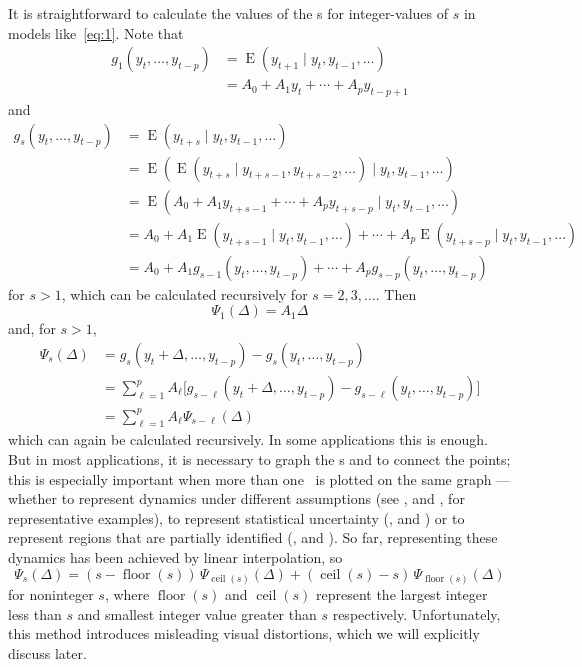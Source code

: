 \documentclass[12pt,fleqn]{article}
\DeclareMathOperator{\E}{E}
\DeclareMathOperator{\floor}{floor}
\DeclareMathOperator{\ceil}{ceil}
\begin{document}
It is straightforward to calculate the values of the \IRF s for
integer-values of $s$ in models like~\eqref{eq:1}.
Note that
\begin{align*}
  g_1(y_t,\dots,y_{t-p}) &= \E(y_{t+1} \mid y_t, y_{t-1},\dots) \\
  &= A_0 + A_1 y_{t} + \cdots + A_p y_{t-p+1}
\end{align*}
and
\begin{align*}
  g_s(y_t,\dots,y_{t-p})
  &= \E(y_{t+s} \mid y_t, y_{t-1},\dots) \\
  &= \E( \E(y_{t+s} \mid y_{t+s-1}, y_{t+s-2},\dots) \mid y_t, y_{t-1},\dots) \\
  &= \E( A_0 + A_1 y_{t+s-1} + \cdots + A_p y_{t+s-p} \mid y_t, y_{t-1},\dots) \\
  &= A_0 + A_1 \E(y_{t+s-1} \mid y_t, y_{t-1},\dots) + \cdots + A_p \E(y_{t+s-p} \mid y_t, y_{t-1},\dots) \\
  &= A_0 + A_1 g_{s-1}(y_t,\dots,y_{t-p}) + \cdots + A_p g_{s-p}(y_t,\dots,y_{t-p})
\end{align*}
for $s > 1$, which can be calculated recursively for $s =
2,3,\dots$. Then
\begin{equation*}
  \Psi_1(\Delta) = A_1 \Delta
\end{equation*}
and, for $s > 1$,
\begin{align*}
  \Psi_s(\Delta)
  &= g_s(y_t + \Delta,\dots,y_{t-p}) - g_s(y_t,\dots,y_{t-p}) \\
  &= \sum_{\ell = 1}^{p} A_\ell \big[g_{s-\ell}(y_t+\Delta,\dots,y_{t-p}) - g_{s-\ell}(y_t,\dots,y_{t-p})\big] \\
  &= \sum_{\ell = 1}^{p} A_\ell \Psi_{s-\ell}(\Delta)
\end{align*}
which can again be calculated recursively. In some applications this
is enough. But in most applications, it is necessary to graph the \IRF
s and to connect the points; this is especially important when more
than one \IRF\ is plotted on the same graph --- whether to represent
dynamics under different assumptions (see \citealp{BeM:98}, and
\citealp{StW:01}, for representative examples), to represent
statistical uncertainty (\citealp{Kil:98}, and \citealp{SiZ:99}) or to
represent regions that are partially identified (\citealp{Uhl:05}, and
\citealp{InK:13}). So far, representing these dynamics has been
achieved by linear interpolation, so 
\begin{equation*}
  \Psi_s(\Delta) = (s - \floor(s)) \, \Psi_{\ceil(s)}(\Delta) + (\ceil(s) - s) \, \Psi_{\floor(s)}(\Delta)
\end{equation*}
for noninteger $s$, where $\floor(s)$ and $\ceil(s)$ represent the
largest integer less than $s$ and smallest integer value greater than
$s$ respectively. Unfortunately, this method introduces misleading
visual distortions, which we will explicitly discuss later.
\end{document}
